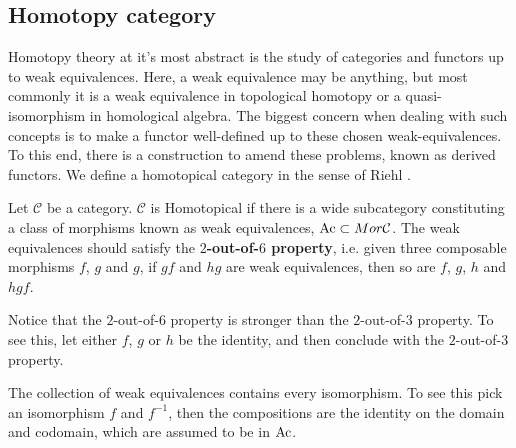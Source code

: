 \documentclass[../thesis.tex]{subfiles}
\begin{document}
        \subsection{Homotopy category}

            Homotopy theory at it's most abstract is the study of categories and functors up to weak equivalences. Here, a weak equivalence may be anything, but most commonly it is a weak equivalence in topological homotopy or a quasi-isomorphism in homological algebra. The biggest concern when dealing with such concepts is to make a functor well-defined up to these chosen weak-equivalences. To this end, there is a construction to amend these problems, known as derived functors. We define a homotopical category in the sense of Riehl \cite{Riehl16}.

            \begin{definition}
                Let $\mathcal{C}$ be a category. $\mathcal{C}$ is Homotopical if there is a wide subcategory constituting a class of morphisms known as weak equivalences, $\tt{Ac}\subset Mor\mathcal{C}$. The weak equivalences should satisfy the \textbf{$2$-out-of-$6$ property}, i.e. given three composable morphisms $f$, $g$ and $g$, if $gf$ and $hg$ are weak equivalences, then so are $f$, $g$, $h$ and $hgf$.

                \begin{center}
                \end{center}
            \end{definition}

            \begin{remark}
                Notice that the $2$-out-of-$6$ property is stronger than the $2$-out-of-$3$ property. To see this, let either $f$, $g$ or $h$ be the identity, and then conclude with the $2$-out-of-$3$ property.
            \end{remark}

            \begin{remark}
                The collection of weak equivalences contains every isomorphism. To see this pick an isomorphism $f$ and $f^{-1}$, then the compositions are the identity on the domain and codomain, which are assumed to be in $\tt{Ac}$.
            \end{remark}
            
\end{document}
